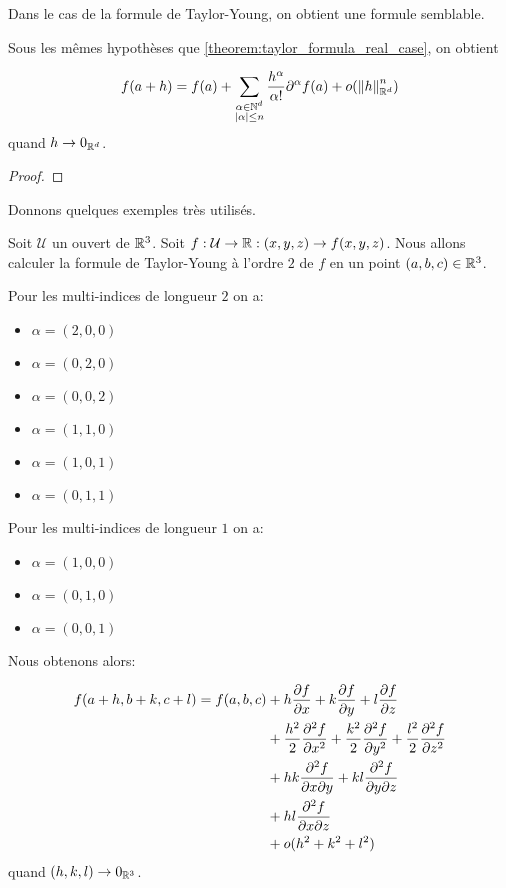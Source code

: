 Dans le cas de la formule de Taylor-Young, on obtient une formule semblable.

\begin{theorem} 
	\label{theorem:taylor_young_formula_real_case}
	Sous les mêmes hypothèses que \ref{theorem:taylor_formula_real_case}, on
	obtient

	\begin{equation*}
		f(a + h) = f(a) + \sum_{\substack{\alpha \in \mathbb{N}^{d} \\
		|\alpha| \leq n}} \frac{h^{\alpha}}{\alpha!}
		\partial^{\alpha}f(a) + o(\norm{h}_{\mathbb{R}^{d}}^{n})
	\end{equation*}
	quand $h \rightarrow 0_{\mathbb{R}^{d}}$.
\end{theorem}

\ifdefined\outputproof
\begin{proof}

\end{proof}
\fi

Donnons quelques exemples très utilisés.

\begin{exemple}
	Soit $\mathcal{U}$ un ouvert de $\mathbb{R}^{3}$.
	Soit $f : \mathcal{U} \rightarrow \mathbb{R} : (x, y, z) \rightarrow f(x, y,
	z)$.
	Nous allons calculer la formule de Taylor-Young à l'ordre $2$ de $f$ en un
	point $(a, b, c) \in \mathbb{R}^{3}$.

	Pour les multi-indices de longueur $2$ on a:
	\begin{itemize}
		\item $\alpha = (2, 0, 0)$
		\item $\alpha = (0, 2, 0)$
		\item $\alpha = (0, 0, 2)$
		\item $\alpha = (1, 1, 0)$
		\item $\alpha = (1, 0, 1)$
		\item $\alpha = (0, 1, 1)$
	\end{itemize}

	Pour les multi-indices de longueur $1$ on a:
	\begin{itemize}
		\item $\alpha = (1, 0, 0)$
		\item $\alpha = (0, 1, 0)$
		\item $\alpha = (0, 0, 1)$
	\end{itemize}

	Nous obtenons alors:

	\begin{align*}
		f(a + h, b + k, c + l) = f(a, b, c)
		& + h \pdv{f}{x} (a, b, c) + k \pdv{f}{y} (a, b, c) + l \pdv{f}{z} (a, b,
		c) \\
		& + \frac{h^{2}}{2} \pdv[2]{f}{x} (a, b, c) + \frac{k^{2}}{2}
		\pdv[2]{f}{y} (a, b, c) + \frac{l^{2}}{2} \pdv[2]{f}{z} (a, b, c) \\
		& + hk \pdv{f}{x}{y} (a, b, c)
		+ kl \pdv{f}{y}{z} (a, b, c) \\
		& + hl \pdv{f}{x}{z} (a, b, c) \\
		& + o(h^{2} + k^{2} + l^{2})
	\end{align*}
	quand $(h, k, l) \rightarrow 0_{\mathbb{R}^{3}}$.
\end{exemple}

